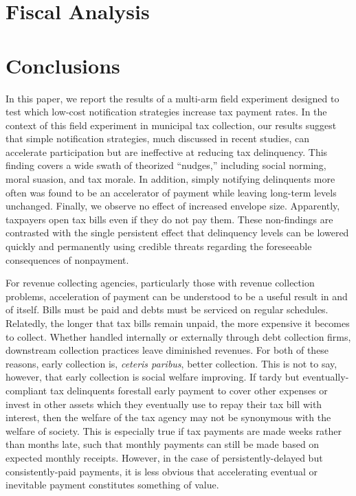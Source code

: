 \documentclass[12pt,titlepage]{article}
\begin{document}
\section{Fiscal Analysis}

\section{Conclusions}

In this paper, we report the results of a multi-arm field experiment 
designed to test which low-cost notification strategies increase tax 
payment rates. In the context of this field experiment in municipal 
tax collection, our results suggest that simple notification strategies, 
much discussed in recent studies, can accelerate participation but are 
ineffective at reducing tax delinquency. This finding covers a 
wide swath of theorized “nudges,” including social norming, moral suasion, 
and tax morale. In addition, simply notifying delinquents more often was 
found to be an accelerator of payment while leaving long-term levels 
unchanged. Finally, we observe no effect of increased envelope size. 
Apparently, taxpayers open tax bills even if they do not pay them.
These non-findings are contrasted with the single persistent effect 
that delinquency levels can be lowered quickly and permanently using 
credible threats regarding the foreseeable consequences of nonpayment. 

For revenue collecting agencies, particularly those with revenue collection 
problems, acceleration of payment can be understood to be a useful result 
in and of itself. Bills must be paid and debts must be serviced on regular 
schedules. Relatedly, the longer that tax bills remain unpaid, the more 
expensive it becomes to collect. Whether handled internally or externally 
through debt collection firms, downstream collection practices leave 
diminished revenues. For both of these reasons, early collection is, 
\textit{ceteris paribus}, better collection. This is not to say, 
however, that early collection is social welfare improving. If tardy 
but eventually-compliant tax delinquents forestall early payment to 
cover other expenses or invest in other assets which they eventually 
use to repay their tax bill with interest, then the welfare of the tax 
agency may not be synonymous with the welfare of society. This is 
especially true if tax payments are made weeks rather than months late, 
such that monthly payments can still be made based on expected monthly 
receipts. However, in the case of persistently-delayed but consistently-paid 
payments, it is less obvious that accelerating eventual or inevitable 
payment constitutes something of value. 
\end{document}
